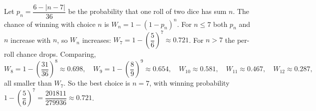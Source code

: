 Let $p_n=\dfrac{6-|n-7|}{36}$ be the probability that one roll of two dice has sum $n$. The chance of winning with choice $n$ is $W_n=1-(1-p_n)^n$. For $n\le7$ both $p_n$ and $n$ increase with $n$, so $W_n$ increases: $W_7=1-\left(\dfrac{5}{6}\right)^7\approx0.721$. For $n>7$ the per-roll chance drops. Comparing,
\[W_8=1-\left(\dfrac{31}{36}\right)^8\approx0.698,\quad W_9=1-\left(\dfrac{8}{9}\right)^9\approx0.654,\quad W_{10}\approx0.581,\quad W_{11}\approx0.467,\quad W_{12}\approx0.287,\]
all smaller than $W_7$. So the best choice is $\boxed{n=7}$, with winning probability $1-\left(\dfrac{5}{6}\right)^7=\dfrac{201811}{279936}\approx0.721$.
